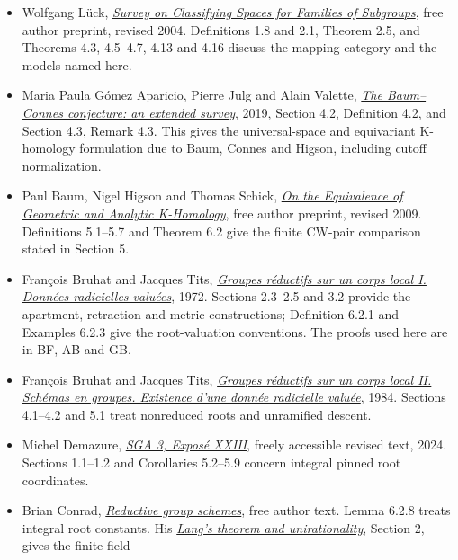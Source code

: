 \documentclass[
  11pt,
]{article}
\providecommand{\tightlist}{%
  \setlength{\itemsep}{0pt}\setlength{\parskip}{0pt}}
\begin{document}
\begin{itemize}
\tightlist
\item
  Wolfgang Lück,
  \href{https://arxiv.org/abs/math/0312378v2}{\emph{Survey on
  Classifying Spaces for Families of Subgroups}}, free author preprint,
  revised 2004. Definitions 1.8 and 2.1, Theorem 2.5, and Theorems 4.3,
  4.5--4.7, 4.13 and 4.16 discuss the mapping category and the models
  named here.
\item
  Maria Paula Gómez Aparicio, Pierre Julg and Alain Valette,
  \href{https://arxiv.org/abs/1905.10081}{\emph{The Baum--Connes
  conjecture: an extended survey}}, 2019, Section 4.2, Definition 4.2,
  and Section 4.3, Remark 4.3. This gives the universal-space and
  equivariant K-homology formulation due to Baum, Connes and Higson,
  including cutoff normalization.
\item
  Paul Baum, Nigel Higson and Thomas Schick,
  \href{https://arxiv.org/abs/math/0701484v4}{\emph{On the Equivalence
  of Geometric and Analytic K-Homology}}, free author preprint, revised
  2009. Definitions 5.1--5.7 and Theorem 6.2 give the finite CW-pair
  comparison stated in Section 5.
\item
  François Bruhat and Jacques Tits,
  \href{https://www.numdam.org/item/PMIHES_1972__41__5_0/}{\emph{Groupes
  réductifs sur un corps local I. Données radicielles valuées}}, 1972.
  Sections 2.3--2.5 and 3.2 provide the apartment, retraction and metric
  constructions; Definition 6.2.1 and Examples 6.2.3 give the
  root-valuation conventions. The proofs used here are in BF, AB and GB.
\item
  François Bruhat and Jacques Tits,
  \href{https://www.numdam.org/item/PMIHES_1984__60__5_0/}{\emph{Groupes
  réductifs sur un corps local II. Schémas en groupes. Existence d'une
  donnée radicielle valuée}}, 1984. Sections 4.1--4.2 and 5.1 treat
  nonreduced roots and unramified descent.
\item
  Michel Demazure,
  \href{https://webusers.imj-prg.fr/~patrick.polo/SGA3/Exp23-13oct24.pdf}{\emph{SGA
  3, Exposé XXIII}}, freely accessible revised text, 2024. Sections
  1.1--1.2 and Corollaries 5.2--5.9 concern integral pinned root
  coordinates.
\item
  Brian Conrad,
  \href{https://math.stanford.edu/~conrad/papers/luminysga3smf.pdf}{\emph{Reductive
  group schemes}}, free author text. Lemma 6.2.8 treats integral root
  constants. His
  \href{https://math.stanford.edu/~conrad/249CS13Page/handouts/langunirat.pdf}{\emph{Lang's
  theorem and unirationality}}, Section 2, gives the finite-field

\end{itemize}
\end{document}

